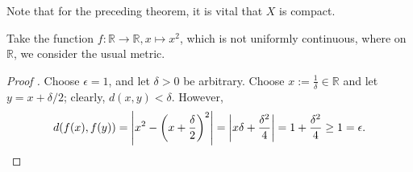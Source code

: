 \begin{remark}
	Note that for the preceding theorem, it is vital that $X$ is compact.
\end{remark}

\begin{exmp}
	Take the function $f: \mathbb R\to \mathbb R, x\mapsto x^2$, which is not uniformly continuous, where on $\mathbb R$, we consider the usual metric.
\end{exmp}

\begin{proof}[Proof \cite{503101}]
	Choose $\epsilon = 1$, and let $\delta > 0$ be arbitrary. Choose $x := \frac{1}{\delta}\in\mathbb R$ and let $y = x + \delta/2$; clearly, $d(x, y) < \delta$. However, $$d(f(x), f(y)) = \left\vert x^2 - \left(x + \frac{\delta}{2}\right)^2 \right\vert = \left\vert x\delta + \frac{\delta^2}{4} \right\vert = 1 + \frac{\delta^2}{4} \geq 1 = \epsilon.$$
\end{proof}